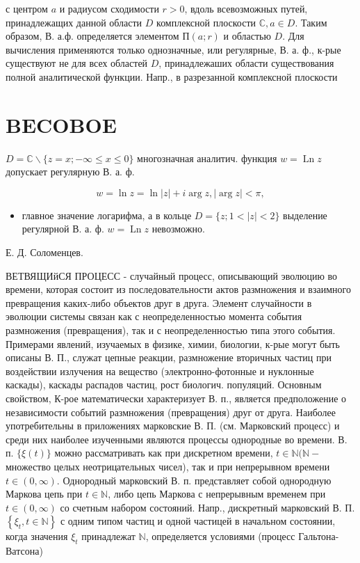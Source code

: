 \documentclass[10pt]{article}
\begin{document}
с центром $a$ и радиусом сходимости $r>0$, вдоль всевозможных путей, принадлежащих данной области $D$ комплексной плоскости $\mathbb{C}, a \in D$. Таким образом, В. а.ф. определяется элементом $П(a ; r)$ и областью $D$. Для вычисления применяются только однозначные, или регулярные, В. а. ф., к-рые существуют не для всех областей $D$, принадлежаших области существования полной аналитической функции. Напр., в разрезанной комплексной плоскости



\section{BECOBOE}

$D=\mathbb{C} \backslash\{z=x ;-\infty \leqslant x \leqslant 0\}$ многозначная аналитич. функция $w=\operatorname{Ln} z$ допускает регулярную В. а. ф.



\[

w=\ln z=\ln |z|+i \arg z,|\arg z|<\pi,

\]



\begin{itemize}

  \item главное значение логарифма, а в кольце $D=\{z ; 1<|z|<2\}$ выделение регулярной В. а. ф. $w=\operatorname{Ln} z$ невозможно.

\end{itemize}



Е. Д. Соломенцев.



ВЕТВЯЩИйСЯ ПРОЦЕСС - случайный процесс, описывающий эволюцию во времени, которая состоит из последовательности актов размножения и взаимного превращения каких-либо объектов друг в друга. Элемент случайности в эволюции системы связан как с неопределенностью момента события размножения (превращения), так и с неопределенностью типа этого события. Примерами явлений, изучаемых в физике, химии, биологии, к-рые могут быть описаны В. П., служат цепные реакции, размножение вторичных частиц при воздействии излучения на вещество (электронно-фотонные и нуклонные каскады), каскады распадов частиц, рост биологич. популяций. Основным свойством, К-рое математически характеризует В. п., является предположение о независимости событий размножения (превращения) друг от друга. Наиболее употребительны в приложениях марковские В. П. (см. Марковский процесс) и среди них наиболее изученными являются процессы однородные во времени. В. п. $\{\xi(t)\}$ можно рассматривать как при дискретном времени, $t \in \mathbb{N}(\mathbb{N}-$ множество целых неотрицательных чисел), так и при непрерывном времени $t \in(0, \infty)$. Однородный марковский В. п. представляет собой однородную Маркова цепь при $t \in \mathbb{N}$, либо цепь Маркова с непрерывным временем при $t \in(0, \infty)$ со счетным набором состояний. Напр., дискретный марковский В. П. $\left\{\xi_{t}, t \in \mathbb{N}\right\}$ с одним типом частиц и одной частицей в начальном состоянии, когда значения $\xi_{t}$ принадлежат $\mathbb{N}$, определяется условиями (процесс Гальтона-Ватсона)
\end{document}
